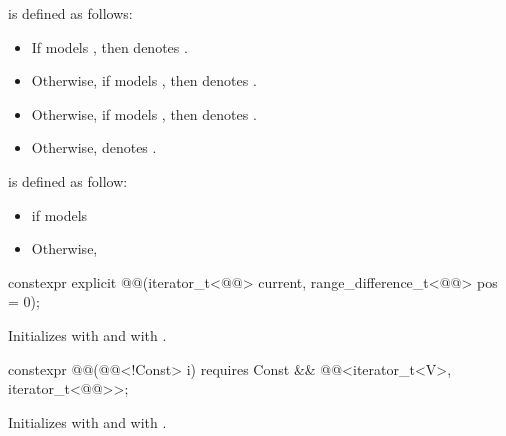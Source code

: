 \documentclass{wg21}
\begin{document}
\begin{addedblock}
 is defined as follows:
\begin{itemize}
\item If  models ,
    then  denotes .
    \item
    Otherwise, if  models ,
    then  denotes .
    \item
    Otherwise, if  models ,
    then   denotes .
     \item
    Otherwise,  denotes .
\end{itemize}

 is defined as follow:
\begin{itemize}
    \item {} if  models 
    \item Otherwise, 
\end{itemize}



\begin{itemdecl}
    constexpr explicit @@(iterator_t<@@> current, range_difference_t<@@> pos = 0);
\end{itemdecl}

\begin{itemdescr}
    \pnum
    \effects
    Initializes  with  and  with .
\end{itemdescr}

\begin{itemdecl}
    constexpr @@(@@<!Const> i)
    requires Const && @@<iterator_t<V>, iterator_t<@@>>;
\end{itemdecl}

\begin{itemdescr}
    \pnum
    \effects
    Initializes  with  and  with .
\end{itemdescr}


\end{addedblock}
\end{document}
